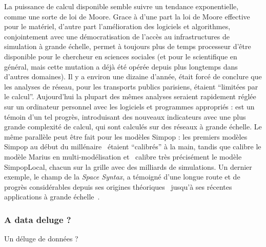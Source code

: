 {La puissance de calcul disponible semble suivre un tendance exponentielle, comme une sorte de loi de Moore. Grace à d'une part la loi de Moore effective pour le matériel, d'autre part l'amélioration des logiciels et algorithmes, conjointement avec une démocratisation de l'accès au infrastructures de simulation à grande échelle, permet à toujours plus de temps processeur d'être disponible pour le chercheur en sciences sociales (et pour le scientifique en général, mais cette mutation a déjà été opérée depuis plus longtemps dans d'autres domaines). Il y a environ une dizaine d'année, \cite{gleyze2005vulnerabilite} était forcé de conclure que les analyses de réseau, pour les transports publics parisiens, étaient ``limitées par le calcul''. Aujourd'hui la plupart des mêmes analyses seraient rapidement réglée sur un ordinateur personnel avec les logiciels et programmes appropriés : \cite{2015arXiv151201268L} est un témoin d'un tel progrès, introduisant des nouveaux indicateurs avec une plus grande complexité de calcul, qui sont calculés sur des réseaux à grande échelle. Le même parallèle peut être fait pour les modèles Simpop : les premiers modèles Simpop au début du millénaire~\cite{sanders1997simpop} étaient ``calibrés'' à la main, tandis que \cite{cottineau2015modular} calibre le modèle Marius en multi-modélisation et~\cite{schmitt2014half} calibre très précisément le modèle SimpopLocal, chacun sur la grille avec des milliards de simulations. Un dernier exemple, le champ de la \emph{Space Syntax}, a témoigné d'une longue route et de progrès considérables depuis ses origines théoriques~\cite{hillier1989social} jusqu'à ses récentes applications à grande échelle~\cite{hillier2016fourth}.
}


\subsubsection{A data deluge ?}{Un déluge de données ?}

